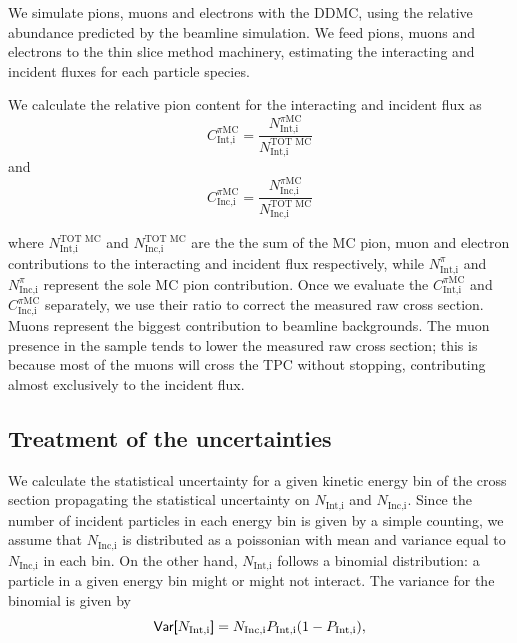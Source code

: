 \documentclass[aps,prl,twocolumn,showpacs,superscriptaddress,groupedaddress]{revtex4}  %
\begin{document}
We simulate pions, muons and electrons with the DDMC, using the relative abundance predicted by the beamline simulation.  We feed pions, muons and electrons to the thin slice method machinery, estimating the interacting and incident fluxes for each particle species.

We calculate the relative pion content for the interacting and incident flux  as
\begin{equation}
C^{\pi \text{MC}}_{\text{Int,i}}  =  \frac{N^{\pi \text{MC}}_{\text{Int,i}}}{ N^{\text{TOT MC}}_{\text{Int,i}} } 
\end{equation}
and 
\begin{equation}
C^{\pi \text{MC}}_{\text{Inc,i}}  =  \frac{N^{\pi \text{MC}}_{\text{Inc,i}}}{ N^{\text{TOT MC}}_{\text{Inc,i}} } 
\end{equation}

where 
$N^{\text{TOT MC}}_{\text{Int,i}}$ and $N^{\text{TOT MC}}_{\text{Inc,i}}$ are the the sum of the MC pion, muon and electron contributions to the interacting and incident flux respectively, while $N^{\pi}_{\text{Int,i}}$ and $N^{\pi}_{\text{Inc,i}}$ represent the sole MC pion contribution. Once we evaluate the $C^{\pi \text{MC}}_{\text{Int,i}}$ and  $C^{\pi \text{MC}}_{\text{Inc,i}}$ separately, we use their ratio to correct the measured raw cross section. Muons represent the biggest contribution to beamline backgrounds. The muon presence in the sample tends to lower the measured raw cross section; this is because most of the muons will cross the TPC without stopping, contributing almost exclusively to the incident flux. 



\subsection{\label{sec:Corrections}Treatment of the uncertainties}
We calculate the statistical uncertainty for a given kinetic energy bin of the cross section propagating the statistical uncertainty on $N_{\text{Int,i}}$ and $N_{\text{Inc,i}}$.  Since the number of incident particles in each energy bin is given by a simple counting, we assume that $N_{\text{Inc,i}}$ is distributed as a poissonian with mean and variance equal to $N_{\text{Inc,i}}$ in each bin.  
On the other hand, $N_{\text{Int,i}}$ follows a binomial distribution: a particle in a given energy bin might or might not interact.  The variance for the binomial is given by  
\begin{equation}
\text{\textsf{Var[}} N_{\text{Int,i}} \text{\textsf{]}}
 = N_{\text{Inc,i}}P_{\text{Int,i}}(1-P_{\text{Int,i}}),
\label{eq:binVar}
\end{equation}
\end{document}
